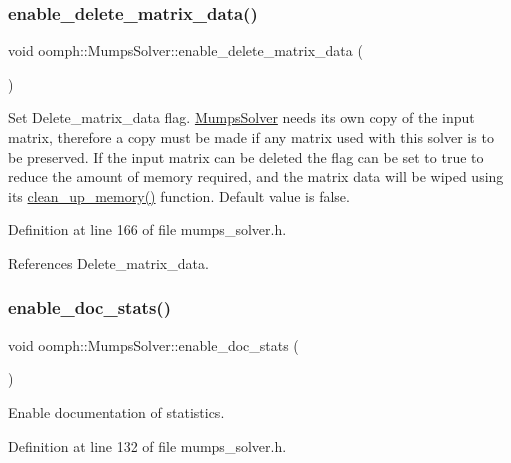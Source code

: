 \subsubsection{\texorpdfstring{enable\+\_\+delete\+\_\+matrix\+\_\+data()}{enable\_delete\_matrix\_data()}}
{\footnotesize\ttfamily void oomph\+::\+Mumps\+Solver\+::enable\+\_\+delete\+\_\+matrix\+\_\+data (\begin{DoxyParamCaption}{ }\end{DoxyParamCaption})\hspace{0.3cm}{\ttfamily [inline]}}



Set Delete\+\_\+matrix\+\_\+data flag. \hyperlink{classoomph_1_1MumpsSolver}{Mumps\+Solver} needs its own copy of the input matrix, therefore a copy must be made if any matrix used with this solver is to be preserved. If the input matrix can be deleted the flag can be set to true to reduce the amount of memory required, and the matrix data will be wiped using its \hyperlink{classoomph_1_1MumpsSolver_adc1541e4a9cbbe9c641f988380618713}{clean\+\_\+up\+\_\+memory()} function. Default value is false. 



Definition at line 166 of file mumps\+\_\+solver.\+h.



References Delete\+\_\+matrix\+\_\+data.

\mbox{\label{classoomph_1_1MumpsSolver_a25426798eb831cf552bdc17c0307ff25}} 
\subsubsection{\texorpdfstring{enable\+\_\+doc\+\_\+stats()}{enable\_doc\_stats()}}
{\footnotesize\ttfamily void oomph\+::\+Mumps\+Solver\+::enable\+\_\+doc\+\_\+stats (\begin{DoxyParamCaption}{ }\end{DoxyParamCaption})\hspace{0.3cm}{\ttfamily [inline]}}



Enable documentation of statistics. 



Definition at line 132 of file mumps\+\_\+solver.\+h.



